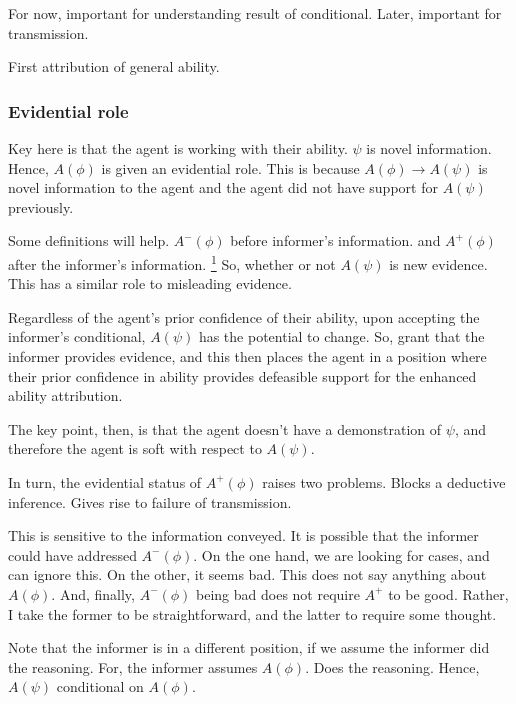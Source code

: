 \documentclass[10pt]{article}
\begin{document}
For now, important for understanding result of conditional.
Later, important for transmission.

First attribution of general ability.

\subsubsection{Evidential role}
\label{sec:evidential-role}

\begin{note}
Key here is that the agent is working with their ability.
\(\psi\) is novel information.
Hence, \(A(\phi)\) is given an evidential role.
This is because \(A(\phi) \rightarrow A(\psi)\) is novel information to the agent and the agent did not have support for \(A(\psi)\) previously.

Some definitions will help.
\(A^{-}(\phi)\) before informer's information.
and
\(A^{+}(\phi)\) after the informer's information.\nolinebreak
\footnote{
  The notation is oblique, but as we're only dealing with a single piece of information, I think it is okay.
}
So, whether or not \(A(\psi)\) is new evidence.
This has a similar role to misleading evidence.

Regardless of the agent's prior confidence of their ability, upon accepting the informer's conditional, \(A(\psi)\) has the potential to change.
So, grant that the informer provides evidence, and this then places the agent in a position where their prior confidence in ability provides defeasible support for the enhanced ability attribution.

The key point, then, is that the agent doesn't have a demonstration of \(\psi\), and therefore the agent is soft with respect to \(A(\psi)\).

In turn, the evidential status of \(A^{+}(\phi)\) raises two problems.
Blocks a deductive inference.
Gives rise to failure of transmission.

This is sensitive to the information conveyed.
It is possible that the informer could have addressed \(A^{-}(\phi)\).
On the one hand, we are looking for cases, and can ignore this.
On the other, it seems bad.
This does not say anything about \(A(\phi)\).
And, finally, \(A^{-}(\phi)\) being bad does not require \(A^{+}\) to be good.
Rather, I take the former to be straightforward, and the latter to require some thought.
\end{note}

\begin{note}
  Note that the informer is in a different position, if we assume the informer did the reasoning.
  For, the informer assumes \(A(\phi)\).
  Does the reasoning.
  Hence, \(A(\psi)\) conditional on \(A(\phi)\).

  For now, assume that reasoning is fine, and if the agent has reasoned then that reasoning is okay.
  Detail further along.
\end{note}
\end{document}
